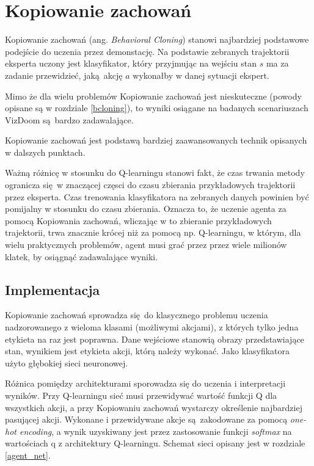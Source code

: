 \section{Kopiowanie zachowań} \label{behavioral_cloning}

Kopiowanie zachowań (ang. \textit{Behavioral Cloning}) stanowi najbardziej podstawowe podejście do uczenia przez demonstację. Na podstawie zebranych trajektorii eksperta uczony jest klasyfikator, który przyjmując na wejściu stan $s$ ma za zadanie przewidzieć, jaką akcję $a$ wykonałby w danej sytuacji ekspert.

Mimo że dla wielu problemów Kopiowanie zachowań jest nieskuteczne (powody opisane są w rozdziale \ref{bcloning}), to wyniki osiągane na badanych scenariuszach VizDoom są bardzo zadawalające.

Kopiowanie zachowań jest podstawą bardziej zaawansowanych technik opisanych w dalszych punktach.

Ważną różnicę w stosunku do Q-learningu stanowi fakt, że czas trwania metody ogranicza się w znaczącej częsci do czasu zbierania przykładowych trajektorii przez eksperta. Czas trenowania klasyfikatora na zebranych danych powinien być pomijalny w stosunku do czasu zbierania. Oznacza to, że uczenie agenta za pomocą Kopiowania zachowań, wliczając w to zbieranie przykładowych trajektorii, trwa znacznie krócej niż za pomocą np. Q-learningu, w którym, dla wielu praktycznych problemów, agent musi grać przez przez wiele milionów klatek, by osiągnąć zadawalające wyniki. 

\subsection{Implementacja}

Kopiowanie zachowań sprowadza się do klasycznego problemu uczenia nadzorowanego z wieloma klasami (możliwymi akcjami), z których tylko jedna etykieta na raz jest poprawna. Dane wejściowe stanowią obrazy przedstawiające stan, wynikiem jest etykieta akcji, którą należy wykonać. Jako klasyfikatora użyto głębokiej sieci neuronowej.

Różnica pomiędzy architekturami sporowadza się do uczenia i interpretacji wyników. Przy Q-learningu sieć musi przewidywać wartość funkcji Q dla wszystkich akcji, a przy Kopiowaniu zachowań wystarczy określenie najbardziej pasującej akcji. Wykonane i przewidywane akcje są zakodowane za pomocą \textit{one-hot encoding}, a wynik uzyskiwany jest przez zastosowanie funkcji \textit{softmax} na wartościach q z architektury Q-learningu. Schemat sieci opisany jest w rozdziale \ref{agent_net}.

